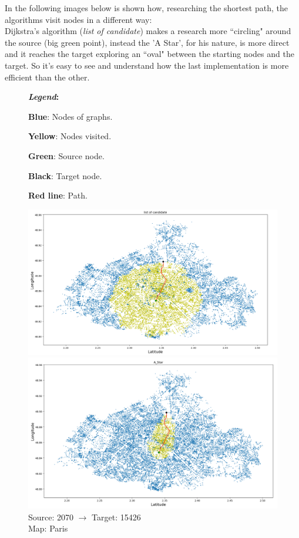 \documentclass[a4paper,11pt]{report}
\begin{document}
In the following images below is shown how, researching the shortest path, the algorithms visit nodes in a different way:\\
Dijkstra's algorithm (\textit{list of candidate}) makes a research more ``circling" around the source (big green point), instead the 'A Star', for his nature, is more direct and it reaches the target exploring an ``oval" between the starting nodes and the target. So it's easy to see and understand how the last implementation is more efficient than the other.\\
  
\begin{figure}[H]
	\textbf{\textit{Legend}:}
	\begin{itemize}
{\small 		\item \textbf{Blue}: Nodes of graphs.
		\item \textbf{Yellow}: Nodes visited.
		\item \textbf{Green}: Source node.
		\item \textbf{Black}: Target node.
		\item \textbf{Red line}: Path.}
	\end{itemize}
	\centering
		\includegraphics[width=\textwidth]{img/mapOutput/2070->15426LoC.png}
		\label{fig:ListOfCandidate1}
		\includegraphics[width=\textwidth]{img/mapOutput/2070->15426A_Star.png}
		\label{fig:A_Start1}
	Source: 2070 $\to$ Target: 15426\\Map: Paris
\end{figure}
\end{document}
